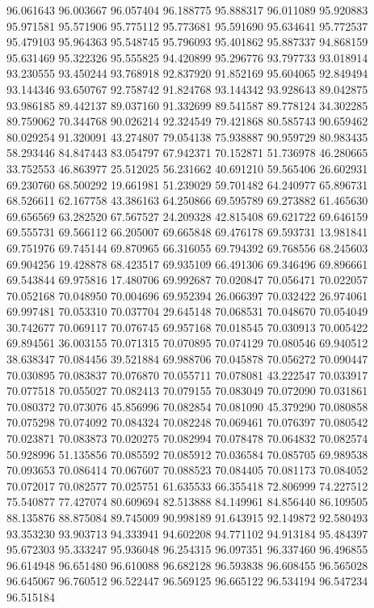 96.061643
96.003667
96.057404
96.188775
95.888317
96.011089
95.920883
95.971581
95.571906
95.775112
95.773681
95.591690
95.634641
95.772537
95.479103
95.964363
95.548745
95.796093
95.401862
95.887337
94.868159
95.631469
95.322326
95.555825
94.420899
95.296776
93.797733
93.018914
93.230555
93.450244
93.768918
92.837920
91.852169
95.604065
92.849494
93.144346
93.650767
92.758742
91.824768
93.144342
93.928643
89.042875
93.986185
89.442137
89.037160
91.332699
89.541587
89.778124
34.302285
89.759062
70.344768
90.026214
92.324549
79.421868
80.585743
90.659462
80.029254
91.320091
43.274807
79.054138
75.938887
90.959729
80.983435
58.293446
84.847443
83.054797
67.942371
70.152871
51.736978
46.280665
33.752553
46.863977
25.512025
56.231662
40.691210
59.565406
26.602931
69.230760
68.500292
19.661981
51.239029
59.701482
64.240977
65.896731
68.526611
62.167758
43.386163
64.250866
69.595789
69.273882
61.465630
69.656569
63.282520
67.567527
24.209328
42.815408
69.621722
69.646159
69.555731
69.566112
66.205007
69.665848
69.476178
69.593731
13.981841
69.751976
69.745144
69.870965
66.316055
69.794392
69.768556
68.245603
69.904256
19.428878
68.423517
69.935109
66.491306
69.346496
69.896661
69.543844
69.975816
17.480706
69.992687
70.020847
70.056471
70.022057
70.052168
70.048950
70.004696
69.952394
26.066397
70.032422
26.974061
69.997481
70.053310
70.037704
29.645148
70.068531
70.048670
70.054049
30.742677
70.069117
70.076745
69.957168
70.018545
70.030913
70.005422
69.894561
36.003155
70.071315
70.070895
70.074129
70.080546
69.940512
38.638347
70.084456
39.521884
69.988706
70.045878
70.056272
70.090447
70.030895
70.083837
70.076870
70.055711
70.078081
43.222547
70.033917
70.077518
70.055027
70.082413
70.079155
70.083049
70.072090
70.031861
70.080372
70.073076
45.856996
70.082854
70.081090
45.379290
70.080858
70.075298
70.074092
70.084324
70.082248
70.069461
70.076397
70.080542
70.023871
70.083873
70.020275
70.082994
70.078478
70.064832
70.082574
50.928996
51.135856
70.085592
70.085912
70.036584
70.085705
69.989538
70.093653
70.086414
70.067607
70.088523
70.084405
70.081173
70.084052
70.072017
70.082577
70.025751
61.635533
66.355418
72.806999
74.227512
75.540877
77.427074
80.609694
82.513888
84.149961
84.856440
86.109505
88.135876
88.875084
89.745009
90.998189
91.643915
92.149872
92.580493
93.353230
93.903713
94.333941
94.602208
94.771102
94.913184
95.484397
95.672303
95.333247
95.936048
96.254315
96.097351
96.337460
96.496855
96.614948
96.651480
96.610088
96.682128
96.593838
96.608455
96.565028
96.645067
96.760512
96.522447
96.569125
96.665122
96.534194
96.547234
96.515184
